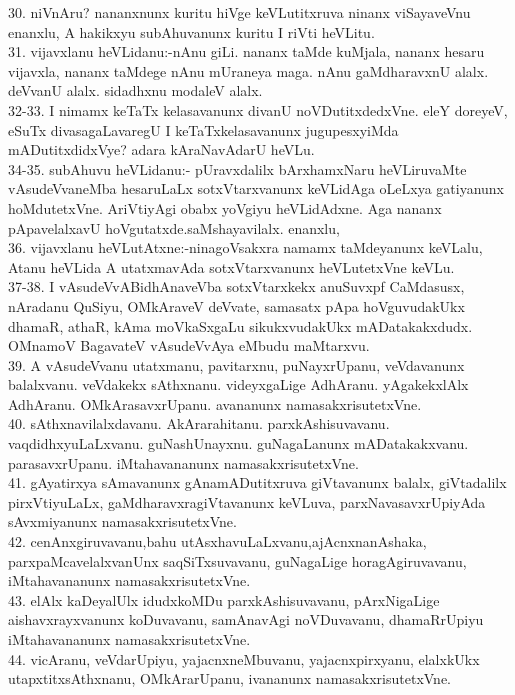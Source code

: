 \documentclass{article}
\begin{document}
30. niVnAru? nananxnunx kuritu hiVge keVLutitxruva ninanx viSayaveVnu enanxlu, A hakikxyu subAhuvanunx kuritu I riVti heVLitu.\\
31. vijavxlanu heVLidanu:-nAnu giLi. nananx taMde kuMjala, nananx hesaru vijavxla, nananx taMdege nAnu mUraneya maga. nAnu gaMdharavxnU alalx. deVvanU alalx. sidadhxnu modaleV alalx.\\
32-33. I nimamx keTaTx kelasavanunx divanU noVDutitxdedxVne. eleY doreyeV, eSuTx divasagaLavaregU I keTaTxkelasavanunx jugupesxyiMda mADutitxdidxVye? adara kAraNavAdarU heVLu.\\
34-35. subAhuvu heVLidanu:- pUravxdalilx bArxhamxNaru heVLiruvaMte vAsudeVvaneMba hesaruLaLx sotxVtarxvanunx keVLidAga oLeLxya gatiyanunx hoMdutetxVne. AriVtiyAgi obabx yoVgiyu heVLidAdxne. Aga nananx pApavelalxavU hoVgutatxde.saMshayavilalx. enanxlu,\\
36. vijavxlanu heVLutAtxne:-ninagoVsakxra namamx taMdeyanunx keVLalu, Atanu heVLida A utatxmavAda sotxVtarxvanunx heVLutetxVne keVLu.\\
37-38. I vAsudeVvABidhAnaveVba sotxVtarxkekx anuSuvxpf CaMdasusx, nAradanu QuSiyu, OMkAraveV deVvate, samasatx pApa hoVguvudakUkx dhamaR, athaR, kAma moVkaSxgaLu sikukxvudakUkx mADatakakxdudx. OMnamoV BagavateV vAsudeVvAya eMbudu maMtarxvu.\\
39. A vAsudeVvanu utatxmanu, pavitarxnu, puNayxrUpanu, veVdavanunx balalxvanu. veVdakekx sAthxnanu. videyxgaLige AdhAranu. yAgakekxlAlx AdhAranu. OMkArasavxrUpanu. avananunx namasakxrisutetxVne.\\
40. sAthxnavilalxdavanu. AkArarahitanu. parxkAshisuvavanu. vaqdidhxyuLaLxvanu. guNashUnayxnu. guNagaLanunx mADatakakxvanu. parasavxrUpanu. iMtahavananunx namasakxrisutetxVne.\\
41. gAyatirxya sAmavanunx gAnamADutitxruva giVtavanunx balalx, giVtadalilx pirxVtiyuLaLx, gaMdharavxragiVtavanunx keVLuva, parxNavasavxrUpiyAda sAvxmiyanunx namasakxrisutetxVne.\\
42. cenAnxgiruvavanu,bahu utAsxhavuLaLxvanu,ajAcnxnanAshaka, parxpaMcavelalxvanUnx saqSiTxsuvavanu, guNagaLige horagAgiruvavanu, iMtahavananunx namasakxrisutetxVne.\\
43. elAlx kaDeyalUlx idudxkoMDu parxkAshisuvavanu, pArxNigaLige aishavxrayxvanunx koDuvavanu, samAnavAgi noVDuvavanu, dhamaRrUpiyu iMtahavananunx namasakxrisutetxVne.\\
44. vicAranu, veVdarUpiyu, yajacnxneMbuvanu, yajacnxpirxyanu, elalxkUkx utapxtitxsAthxnanu, OMkArarUpanu, ivananunx namasakxrisutetxVne.\\
\end{document}
